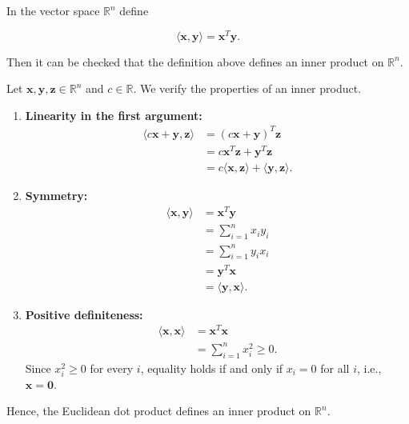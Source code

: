 \begin{example}
	In the vector space \( \mathbb{R}^n \) define

	\begin{equation}
		\langle \mathbf{x}, \mathbf{y}\rangle = \mathbf{x}^T \mathbf{y}.
		\label{eq:inner-product-5}
	\end{equation}

	Then it can be checked that the definition above defines an inner product on \( \mathbb{R}^n \).


	Let $\mathbf{x},\mathbf{y},\mathbf{z}\in\mathbb{R}^n$ and
	$c\in\mathbb{R}$. We verify the properties of an inner product.

	\begin{enumerate}
		\item \textbf{Linearity in the first argument:}
		      \begin{align*}
			      \langle c\mathbf{x}+\mathbf{y},\mathbf{z}\rangle
			       & = (c\mathbf{x}+\mathbf{y})^T\mathbf{z}           \\
			       & = c\mathbf{x}^T\mathbf{z}+\mathbf{y}^T\mathbf{z} \\
			       & = c\langle\mathbf{x},\mathbf{z}\rangle
			      +\langle\mathbf{y},\mathbf{z}\rangle.
		      \end{align*}

		\item \textbf{Symmetry:}
		      \begin{align*}
			      \langle\mathbf{x},\mathbf{y}\rangle
			       & = \mathbf{x}^T\mathbf{y}               \\
			       & = \sum_{i=1}^{n}x_i y_i                \\
			       & = \sum_{i=1}^{n}y_i x_i                \\
			       & = \mathbf{y}^T\mathbf{x}               \\
			       & = \langle\mathbf{y},\mathbf{x}\rangle.
		      \end{align*}

		\item \textbf{Positive definiteness:}
		      \begin{align*}
			      \langle\mathbf{x},\mathbf{x}\rangle
			       & = \mathbf{x}^T\mathbf{x}      \\
			       & = \sum_{i=1}^{n}x_i^2 \geq 0.
		      \end{align*}
		      Since $x_i^2\geq 0$ for every $i$, equality holds
		      if and only if $x_i=0$ for all $i$, i.e.,
		      $\mathbf{x}=\mathbf{0}$.
	\end{enumerate}

	Hence, the Euclidean dot product defines an inner product
	on $\mathbb{R}^n$.
\end{example}

